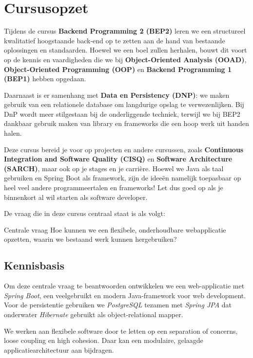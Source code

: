 \chapter{Cursusopzet}
Tijdens de cursus \textbf{Backend Programming 2 (BEP2)} leren we 
een structureel kwalitatief hoogstaande back-end 
op te zetten aan de hand van bestaande oplossingen en standaarden.
Hoewel we een boel zullen herhalen, bouwt dit voort 
op de kennis en vaardigheden
die we bij \textbf{Object-Oriented Analysis (OOAD)}, 
\textbf{Object-Oriented Programming (OOP)}
en \textbf{Backend Programming 1 (BEP1)} hebben opgedaan.

Daarnaast is er samenhang met \textbf{Data en Persistency (DNP)}:
we maken gebruik van een  relationele database om langdurige 
opslag te verwezenlijken. Bij DnP wordt meer stilgestaan bij 
de onderliggende techniek, terwijl we bij BEP2 dankbaar gebruik 
maken van library en frameworks die een hoop werk uit handen halen.

Deze cursus bereid je voor op projecten en andere cursussen, zoals
\textbf{Continuous Integration and Software Quality (CISQ)} 
en \textbf{Software Architecture (SARCH)},
maar ook op je stages en je carrière. Hoewel we Java als taal gebruiken 
en Spring Boot als framework, zijn de ideeën namelijk
toepasbaar op heel veel andere programmeertalen en frameworks!
Let dus goed op als je binnenkort al wil starten als software developer.

De vraag die in deze cursus centraal staat is als volgt:

\begin{defbox}{Centrale vraag}
Hoe kunnen we een flexibele, onderhoudbare webapplicatie opzetten, waarin we bestaand werk kunnen hergebruiken?
\end{defbox}

\section{Kennisbasis}
Om deze centrale vraag te beantwoorden ontwikkelen we 
een web-applicatie met \textit{Spring Boot}, een veelgebruikt 
en modern Java-framework voor web development. Voor de persistentie 
gebruiken we \textit{PostgreSQL} tezamen met \textit{Spring JPA} dat
onderwater \textit{Hibernate} gebruikt als object-relational mapper.

We werken aan flexibele software door te letten
op een separation of concerns, loose coupling en high cohesion.
Daar kan een modulaire, gelaagde applicatiearchitectuur aan bijdragen.


